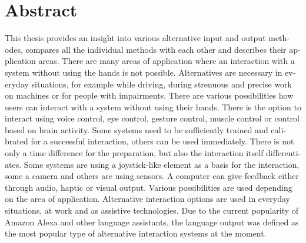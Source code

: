 \chapter{Abstract}

\begin{english} %
%
This thesis provides an insight into various alternative input and output methodes, compares all the individual methods with each other and describes their application areas.
\newline \newline
There are many areas of application where an interaction with a system without using the hands is not possible. Alternatives are necessary in everyday situations, for example while driving, during strenuous and precise work on machines or for people with impairments.
\newline \newline
There are various possibilities how users can interact with a system without using their hands. There is the option to interact using voice control, eye control, gesture control, muscle control or control based on brain activity. Some systems need to be sufficiently trained and calibrated for a successful interaction, others can be used immediately. There is not only a time difference for the preparation, but also the interaction itself differentiates. Some systems are using a joystick-like element as a basis for the interaction, some a camera and others are using sensors. 
\newline \newline
A computer can give feedback either through audio, haptic or visual output. Various possibilities are used depending on the area of application.
\newline \newline
Alternative interaction options are used in everyday situations, at work and as assistive technologies. Due to the current popularity of Amazon Alexa and other language assistants, the language output was defined as the most popular type of alternative interaction systems at the moment.
%
\end{english}


